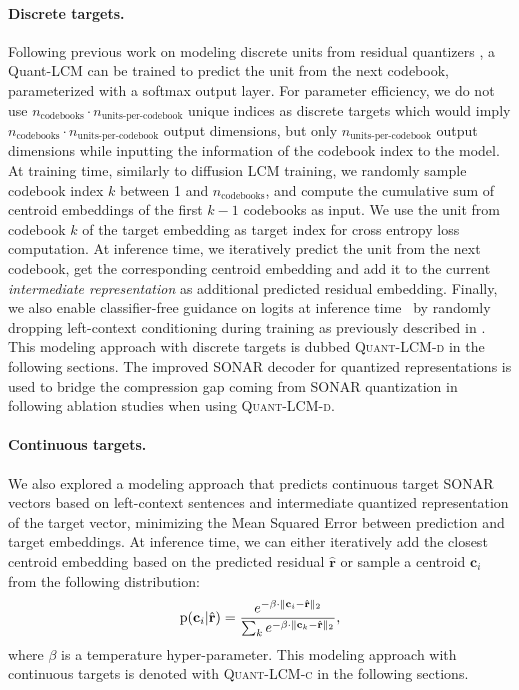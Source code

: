 \documentclass[twoside,11pt]{fairmeta}
\newcommand{\lcm}{\textsc{LCM}\xspace}
\newcommand{\qlcmd}{\textsc{Quant-LCM-d}\xspace}
\newcommand{\qlcmc}{\textsc{Quant-LCM-c}\xspace}
\def\rp{{\textnormal{p}}}
\def\rvc{{\mathbf{c}}}
\def\rvr{{\mathbf{r}}}
\begin{document}
\paragraph{Discrete targets.}
Following previous work on modeling discrete units from residual quantizers \citep{valle,audiopalm,lee2022autoregressive}, a Quant-LCM can be trained to predict the unit from the next codebook, parameterized with a softmax output layer. For parameter efficiency, we do not use $n_\text{codebooks} \cdot n_\text{units-per-codebook}$  unique indices as discrete targets which would imply $n_\text{codebooks} \cdot n_\text{units-per-codebook}$ output dimensions, but only $n_\text{units-per-codebook}$ output dimensions while inputting the information of the codebook index to the model. At training time, similarly to diffusion \lcm training, we randomly sample codebook index $k$ between 1 and  $n_\text{codebooks}$, and compute the cumulative sum of centroid embeddings of the first $k {-}1$ codebooks as input. We use the unit from codebook $k$ of the target embedding as target index for cross entropy loss computation. At inference time, we iteratively predict the unit from the next codebook, get the corresponding centroid embedding and add it to the current \textit{intermediate representation} as additional predicted residual embedding. Finally, we also enable classifier-free guidance on logits at inference time~\citep{gafni2022make}
by randomly dropping left-context conditioning during training as previously described in . This modeling approach with discrete targets is dubbed \qlcmd in the following sections. The improved SONAR decoder for quantized representations is used to bridge the compression gap coming from SONAR quantization in following ablation studies when using \qlcmd.


\paragraph{Continuous targets.} 
We also explored a modeling approach that predicts continuous target SONAR vectors based on left-context sentences and intermediate quantized representation of the target vector, minimizing the Mean Squared Error between prediction and target embeddings. At inference time, we can either iteratively add the closest centroid embedding based on the predicted residual $\hat{\rvr}$ or sample a centroid $\rvc_i$ from the following distribution: 
\begin{align}
\rp(\rvc_i| \hat\rvr) = \dfrac{
e^{-\beta \cdot \| \rvc_i - \hat{\rvr} \|_2}
}{
\sum_{k}{e^{-\beta \cdot \| \rvc_k - \hat{\rvr} \|_2}}},
\end{align}
where $\beta$ is a temperature hyper-parameter. This modeling approach with continuous targets is denoted with \qlcmc in the following sections.
\end{document}
